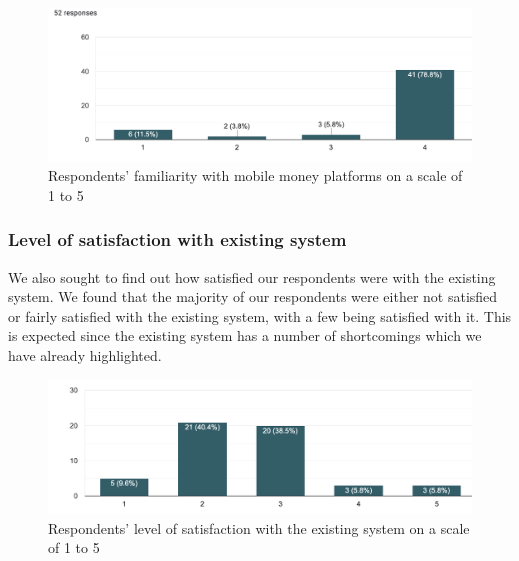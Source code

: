 \begin{figure}[h]
    \begin{center}
        \hspace{-3cm}
        \includegraphics[scale = 0.5]{images/mob-mon}
        \caption{Respondents' familiarity with mobile money platforms on a scale of 1 to 5}
    \end{center}
\end{figure}

\clearpage

\subsubsection{Level of satisfaction with existing system}

We also sought to find out how satisfied our respondents were with the existing system. We found that the majority of our respondents were either not satisfied or fairly satisfied with the existing system, with a few being satisfied with it. This is expected since the existing system has a number of shortcomings which we have already highlighted.

\begin{figure}[h]
    \begin{center}
        \hspace{-3cm}
        \includegraphics[scale = 0.5]{images/satisfaction}
        \caption{Respondents' level of satisfaction with the existing system on a scale of 1 to 5}
    \end{center}
\end{figure}

\clearpage

